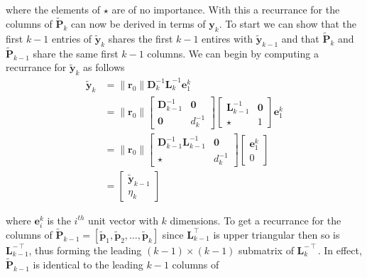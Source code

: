 where the elements of $\star$ are of no importance. With this a recurrance for the columns of $\tilde{\bm{P}}_k$ can now be derived in terms of $\bm{y}_k$. To start we can show that the first $k-1$ entries of $\tilde{\bm{y}}_{k}$ shares the first $k-1$ entires with $\tilde{\bm{y}}_{k-1}$ and that $\tilde{\bm{P}}_k$ and $\tilde{\bm{P}}_{k-1}$ share the same first $k-1$ columns. We can begin by computing a recurrance for $\tilde{\bm{y}}_{k}$ as follows
\begin{align*}
    \tilde{\bm{y}}_{k} & = \| \bm{r}_0 \| \bm{D}_k^{-1} \bm{L}_k^{-1} \bm{e}_1^k \\
                       & = \| \bm{r}_0 \|
    \begin{bmatrix}
        \bm{D}_{k-1}^{-1} & \bm{0}   \\
        \bm{0}            & d_k^{-1}
    \end{bmatrix}
    \begin{bmatrix}
        \bm{L}_{k-1}^{-1} & \bm{0} \\
        \star             & 1
    \end{bmatrix}
    \bm{e}_1^k                                                                   \\
                       & = \| \bm{r}_0 \|
    \begin{bmatrix}
        \bm{D}_{k-1}^{-1} \bm{L}_{k-1}^{-1} & \bm{0}   \\
        \star                               & d_k^{-1}
    \end{bmatrix}
    \begin{bmatrix}
        \bm{e}_1^k \\
        0
    \end{bmatrix}                                                   \\
                       & =
    \begin{bmatrix}
        \tilde{\bm{y}}_{k-1} \\
        \eta_k
    \end{bmatrix}
\end{align*}

where $\bm{e}_i^k$ is the $i^{th}$ unit vector with $k$ dimensions. To get a recurrance for the columns of $\tilde{\bm{P}}_{k-1} = \left[ \tilde{\bm{p}}_1 , \tilde{\bm{p}}_2 , \ldots , \tilde{\bm{p}}_k \right]$ since $\bm{L}_{k-1}^{\intercal}$ is upper triangular then so is $\bm{L}_{k-1}^{-\intercal}$, thus forming the leading $(k-1) \times (k-1)$ submatrix of $\bm{L}_{k}^{-\intercal}$. In effect, $\tilde{\bm{P}}_{k-1}$ is identical to the leading $k-1$ columns of

